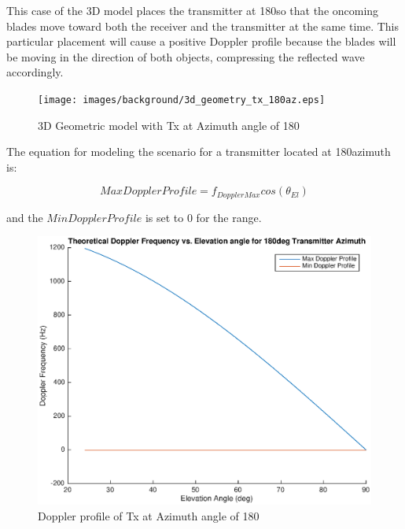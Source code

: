This case of the 3D model places the transmitter at 180\textdegree \space so that the oncoming blades move toward both the receiver and the transmitter at the same time. This particular placement will cause a positive Doppler profile because the blades will be moving in the direction of both objects, compressing the reflected wave accordingly.

\begin{figure}
	\begin{center}
		\texttt{[image: images/background/3d\_geometry\_tx\_180az.eps]}
		\caption{3D Geometric model with Tx at Azimuth angle of 180\textdegree}
		\label{fig:3D_model_180az}
	\end{center}
\end{figure}

The equation for modeling the scenario for a transmitter located at 180\textdegree \space azimuth is:

\begin{equation}
	MaxDopplerProfile = f_{DopplerMax}cos(\theta_{El})
	\label{eq:theory_180_upper}
\end{equation}

and the $MinDopplerProfile$ is set to 0 for the range.

\begin{figure}
	\begin{center}
		\includegraphics[width=15cm]{images/background/3d_geometry_tx_180az_doppler_profile.eps}
		\caption{Doppler profile of Tx at Azimuth angle of 180\textdegree}
		\label{fig:3D_model_180az_doppler}
	\end{center}
\end{figure}

